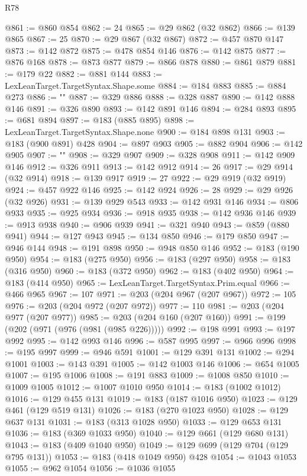 \begin{lexlean}{R78}
\begin{coremodule}
@861 := @860 @854
@862 := 24
@865 := @29 @862 (@32 @862)
@866 := @139 @865
@867 := 25
@870 := @29 @867 (@32 @867)
@872 := @457 @870 @147
@873 := @142 @872
@875 := @478 @854 @146
@876 := @142 @875
@877 := @876 @168
@878 := @873 @877
@879 := @866 @878
@880 := @861 @879
@881 := @179 @22
@882 := @881 @144
@883 := LexLeanTarget.TargetSyntax.Shape.some
@884 := @184 @883
@885 := @884 @273
@886 := "{"
@887 := @329 @886
@888 := @328 @887
@890 := @142 @888 @146
@891 := @326 @890
@893 := @142 @891 @146
@894 := @284 @893
@895 := @681 @894
@897 := @183 (@885 @895)
@898 := LexLeanTarget.TargetSyntax.Shape.none
@900 := @184 @898 @131
@903 := @183 (@900 @891) @428
@904 := @897 @903
@905 := @882 @904
@906 := @142 @905
@907 := "}"
@908 := @329 @907
@909 := @328 @908
@911 := @142 @909 @146
@912 := @326 @911
@913 := @142 @912
@914 := 26
@917 := @29 @914 (@32 @914)
@918 := @139 @917
@919 := 27
@922 := @29 @919 (@32 @919)
@924 := @457 @922 @146
@925 := @142 @924
@926 := 28
@929 := @29 @926 (@32 @926)
@931 := @139 @929 @543
@933 := @142 @931 @146
@934 := @806 @933
@935 := @925 @934
@936 := @918 @935
@938 := @142 @936 @146
@939 := @913 @938
@940 := @906 @939
@941 := @321 @940
@943 := @859 (@880 @941)
@944 := @127 @943
@945 := @134 @850
@946 := @179 @850
@947 := @946 @144
@948 := @191 @898
@950 := @948 @850 @146
@952 := @183 (@190 @950)
@954 := @183 (@275 @950)
@956 := @183 (@297 @950)
@958 := @183 (@316 @950)
@960 := @183 (@372 @950)
@962 := @183 (@402 @950)
@964 := @183 (@414 @950)
@965 := LexLeanTarget.TargetSyntax.Prim.equal
@966 := @466 @965
@967 := 107
@971 := @203 (@204 @967 (@207 @967))
@972 := 105
@976 := @203 (@204 @972 (@207 @972))
@977 := 110
@981 := @203 (@204 @977 (@207 @977))
@985 := @203 (@204 @160 (@207 @160))
@991 := @199 (@202 (@971 (@976 (@981 (@985 @226)))))
@992 := @198 @991
@993 := @197 @992
@995 := @142 @993 @146
@996 := @587 @995
@997 := @966 @996
@998 := @195 @997
@999 := @946 @591
@1001 := @129 @391 @131
@1002 := @294 @1001
@1003 := @143 @391
@1005 := @142 @1003 @146
@1006 := @654 @1005
@1007 := @195 @1006
@1008 := @191 @883
@1009 := @1008 @850
@1010 := @1009 @1005
@1012 := @1007 @1010 @950
@1014 := @183 (@1002 @1012)
@1016 := @129 @455 @131
@1019 := @183 (@187 @1016 @950)
@1023 := @129 @461 (@129 @519 @131)
@1026 := @183 (@270 @1023 @950)
@1028 := @129 @637 @131
@1031 := @183 (@313 @1028 @950)
@1033 := @129 @653 @131
@1036 := @183 (@369 @1033 @950)
@1040 := @129 @661 (@129 @680 @131)
@1043 := @183 (@409 @1040 @950)
@1049 := @129 @699 (@129 @704 (@129 @795 @131))
@1053 := @183 (@418 @1049 @950) @428
@1054 := @1043 @1053
@1055 := @962 @1054
@1056 := @1036 @1055

\end{coremodule}
\end{lexlean}
